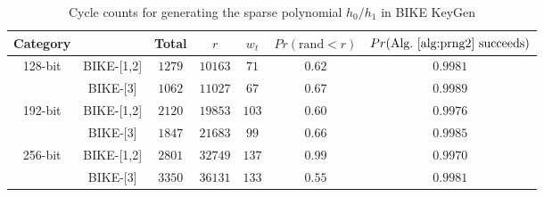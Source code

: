 \documentclass[preprint]{iacrtrans}
\begin{document}
\begin{table}[!tb]\centering
\caption{Cycle counts for generating the sparse polynomial $h_0/h_1$ in BIKE KeyGen}
\begin{tabular}{cc|ccccc}
  \hline
 \textbf{Category}        &             & Total & $r$  & $w_t$  & $Pr(\text{rand} < r)$& $Pr(\text{Alg.~\ref{alg:prng2} succeeds})$\\\hline
\multirow{ 2}{*}{128-bit} &  BIKE-[1,2] & $1279$ & $10163$  & $71$  & $0.62$ & $0.9981$\\
                          &  BIKE-[3] & $1062$ & $11027$  & $67$  & $0.67$& $0.9989$\\
  \hline
\multirow{ 2}{*}{192-bit} &  BIKE-[1,2] & $2120$ & $19853$  & $103$  &$0.60$& $0.9976$\\
                          &  BIKE-[3] & $1847$ & $21683$  & $99$  &$0.66$& $0.9985$\\
  \hline
\multirow{ 2}{*}{256-bit} &  BIKE-[1,2] & $2801$ & $32749$  & $137$  &$0.99$& $0.9970$\\
                          &  BIKE-[3] & $3350$ & $36131$  & $133$  &$0.55$& $0.9981$\\
  \hline
\end{tabular}
\end{table}
\end{document}
